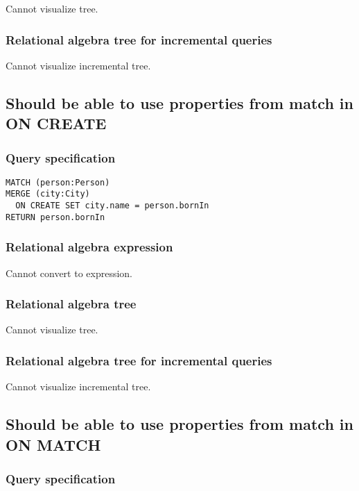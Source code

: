 Cannot visualize tree.

\subsubsection*{Relational algebra tree for incremental queries}

Cannot visualize incremental tree.

\subsection{Should be able to use properties from match in ON CREATE}

\subsubsection*{Query specification}

\begin{lstlisting}
MATCH (person:Person)
MERGE (city:City)
  ON CREATE SET city.name = person.bornIn
RETURN person.bornIn
\end{lstlisting}

\subsubsection*{Relational algebra expression}

Cannot convert to expression.

\subsubsection*{Relational algebra tree}

Cannot visualize tree.

\subsubsection*{Relational algebra tree for incremental queries}

Cannot visualize incremental tree.

\subsection{Should be able to use properties from match in ON MATCH}

\subsubsection*{Query specification}

